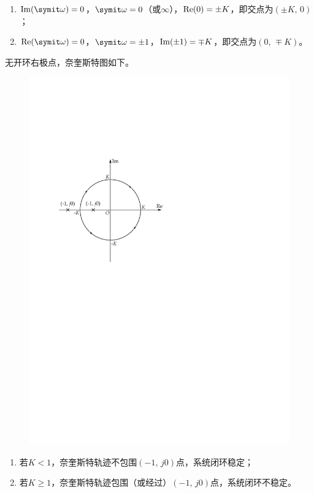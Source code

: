 \begin{exercise}
\begin{enumerate}
        \begin{enumerate}
            \item ${\rm Im}(\varomega)=0$，$\varomega = 0$（或$\infty$），${\rm Re}(0) = \pm K$，即交点为$(\pm K,\,0)$；
            \item ${\rm Re}(\varomega)=0$，$\varomega = \pm 1$，${\rm Im}(\pm 1) = \mp K$，即交点为$(0,\,\mp K)$。
        \end{enumerate}
        无开环右极点，奈奎斯特图如下。
        \begin{figure}[H]
            \centering
            \includegraphics[scale=0.6]{figures/figure5.2.pdf}
        \end{figure}
    \end{enumerate}
    \begin{enumerate}
        \item 若$K<1$，奈奎斯特轨迹不包围$(-1,\,j0)$点，系统闭环稳定；
        \item 若$K\geqslant 1$，奈奎斯特轨迹包围（或经过）$(-1,\,j0)$点，系统闭环不稳定。
    \end{enumerate}
\end{exercise}

